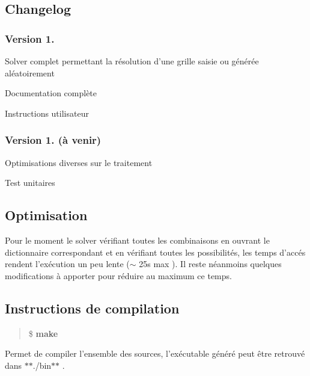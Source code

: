 \subsection*{Changelog}

\subsubsection*{Version 1.}


\begin{DoxyItemize}
\item Solver complet permettant la résolution d'une grille saisie ou générée aléatoirement
\item Documentation complète
\item Instructions utilisateur
\end{DoxyItemize}

\subsubsection*{Version 1. (à venir)}


\begin{DoxyItemize}
\item Optimisations diverses sur le traitement
\item Test unitaires
\end{DoxyItemize}

\subsection*{Optimisation}

Pour le moment le solver vérifiant toutes les combinaisons en ouvrant le dictionnaire correspondant et en vérifiant toutes les possibilités, les temps d'accés rendent l'exécution un peu lente ($\sim$ 25s max ). Il reste néanmoins quelques modifications à apporter pour réduire au maximum ce temps.

\subsection*{Instructions de compilation}

\begin{quotation}
\$ {\bfseries make}

\end{quotation}


Permet de compiler l'ensemble des sources, l'exécutable généré peut être retrouvé dans $\ast$$\ast$./bin$\ast$$\ast$ .

